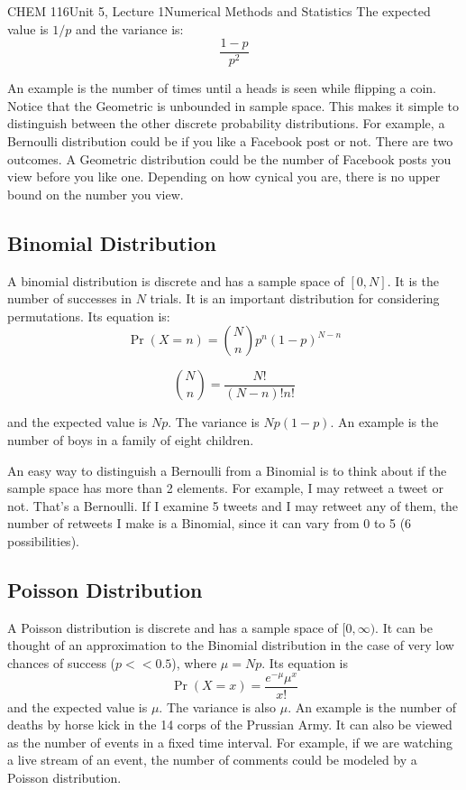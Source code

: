 \documentclass{article}
\begin{document}
\begin{tdoc}{CHEM 116}{Unit 5, Lecture 1}{Numerical Methods and Statistics}
The expected value is $1 / p$ and the variance is:
\begin{equation}
\frac{1 - p}{p^2}
\end{equation}

An example is the number of times until a heads is seen while flipping
a coin. Notice that the Geometric is unbounded in sample space. This
makes it simple to distinguish between the other discrete probability
distributions. For example, a Bernoulli distribution could be if you
like a Facebook post or not. There are two outcomes. A Geometric
distribution could be the number of Facebook posts you view before you
like one. Depending on how cynical you are, there is no upper bound on
the number you view.

\subsection{Binomial Distribution}
A binomial distribution is discrete and has a sample space of
$[0,N]$. It is the number of successes in $N$ trials. It is an
important distribution for considering permutations. Its equation is:
\begin{equation}
\Pr(X=n) =  {N \choose n} p^n(1 - p)^{N - n}
\end{equation}

\begin{equation}
  {N \choose n} = \frac{N!}{(N - n)! n!}
\end{equation}

and the expected value is $Np$. The variance is $Np(1-p)$. An example
is the number of boys in a family of eight children.

An easy way to distinguish a Bernoulli from a Binomial is to think
about if the sample space has more than 2 elements. For example, I may
retweet a tweet or not. That's a Bernoulli. If I examine 5 tweets and
I may retweet any of them, the number of retweets I make is a
Binomial, since it can vary from 0 to 5 (6 possibilities).

\subsection{Poisson Distribution}
A Poisson distribution is discrete and has a sample space of
$[0,\infty)$. It can be thought of an approximation to the Binomial
  distribution in the case of very low chances of success ($p << 0.5$),
  where $\mu = Np$. Its equation is
\begin{equation}
\Pr(X = x) = \frac{e^{-\mu}{\mu^x}}{x!}
\end{equation}
and the expected value is $\mu$. The variance is also $\mu$. An
example is the number of deaths by horse kick in the 14 corps of the
Prussian Army. It can also be viewed as the number of events in a
fixed time interval. For example, if we are watching a live stream of
an event, the number of comments could be modeled by a Poisson
distribution.


\end{tdoc}
\end{document}
